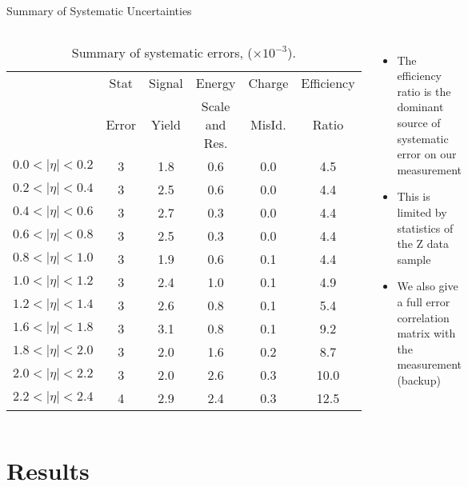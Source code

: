 \documentclass[8pt]{beamer}
\begin{document}
\begin{frame}{Summary of Systematic Uncertainties}
  \begin{columns}[c]
  \tiny{
  \begin{center}
    \begin{table}
    \begin{tabular}{l|c|cccc}
      \hline\hline
      &Stat  &Signal & Energy & Charge &  Efficiency \\
     & Error &Yield & Scale and Res. & MisId. & Ratio \\ \hline
      $0.0<|\eta|<0.2$& 3& 1.8 & 0.6 & 0.0 &  4.5 \\
      $0.2<|\eta|<0.4$& 3& 2.5 & 0.6 & 0.0 &  4.4 \\
      $0.4<|\eta|<0.6$& 3& 2.7 & 0.3 & 0.0 &  4.4 \\
      $0.6<|\eta|<0.8$& 3& 2.5 & 0.3 & 0.0 &  4.4 \\
      $0.8<|\eta|<1.0$& 3& 1.9 & 0.6 & 0.1 &  4.4 \\
      $1.0<|\eta|<1.2$& 3& 2.4 & 1.0 & 0.1 &  4.9 \\
      $1.2<|\eta|<1.4$& 3& 2.6 & 0.8 & 0.1 &  5.4 \\
      $1.6<|\eta|<1.8$& 3& 3.1 & 0.8 & 0.1 &  9.2 \\
      $1.8<|\eta|<2.0$& 3& 2.0 & 1.6 & 0.2 &  8.7 \\
      $2.0<|\eta|<2.2$& 3& 2.0 & 2.6 & 0.3 & 10.0 \\
      $2.2<|\eta|<2.4$& 4& 2.9 & 2.4 & 0.3 & 12.5 \\
    \end{tabular}
    \caption{Summary of systematic errors, ($\times 10^{-3}$).  }
    \end{table}
  \end{center} 
  }

    \begin{itemize}
      \item The efficiency ratio is the dominant source of systematic error on
      our measurement
      \item This is limited by statistics of the Z data sample
      \item We also give a full error correlation matrix with the measurement
      (backup)
    \end{itemize}
  \end{columns}
\end{frame}

\section{Results}
\end{document}
